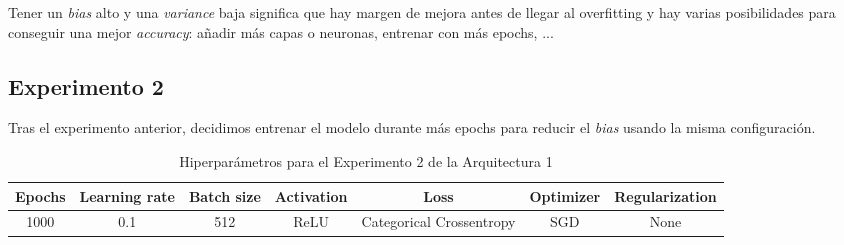 \documentclass{article}
\begin{document}
			Tener un \textit{bias} alto y una \textit{variance} baja significa que hay margen de mejora antes de llegar al overfitting y hay varias posibilidades para conseguir una mejor \textit{accuracy}: a\~nadir m\'as capas o neuronas, entrenar con m\'as epochs, ...
		
		\subsection{Experimento 2}
		\label{s-a1-e2}
			Tras el experimento anterior, decidimos entrenar el modelo durante m\'as epochs para reducir el \textit{bias} usando la misma configuraci\'on.\\
			\begin{table}[h]
			\begin{center}
				\begin{tabular}{| c | c | c | c | c | c | c |}
					\textbf{Epochs} & \textbf{Learning rate} & \textbf{Batch size} & \textbf{Activation} & \textbf{Loss} & \textbf{Optimizer} & \textbf{Regularization} \\ \hline
					1000 & 0.1 & 512 & ReLU & Categorical Crossentropy & SGD & None
				\end{tabular}
				\caption{Hiperpar\'ametros para el Experimento 2 de la Arquitectura 1}
				\label{tab:hip-a1-e2}
			\end{center}
		\end{table}
			
\end{document}

